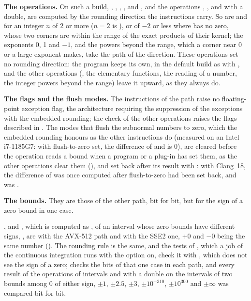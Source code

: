 \documentclass[12pt,a4paper,twoside,openright]{book}
\begin{document}
\medskip
\noindent
\textbf{The operations.} On such a build, , ,
, ,  and , and the
operations \code{+}, \code{-}, \code{*} and \code{/} with a double, are
computed by the rounding direction the instructions carry. So are
 and  for an integer $n$ of 2 or more
($n=2$ is ), or of $-2$ or less where  has no zero,
whose two corners are within the range of the exact products of their kernel;
the exponents 0, 1 and $-1$, and the powers beyond the range, which a corner
near 0 or a large exponent makes, take the path of the direction. These
operations set no rounding direction: the program keeps its own, in the
default build as with , and the other
operations (\code{\%}, the elementary functions, the reading of a number, the
integer powers beyond the range) leave it upward, as they always do.

\medskip
\noindent
\textbf{The flags and the flush modes.} The instructions of the path raise no
floating-point exception flag, the architecture requiring the suppression of
the exceptions with the embedded rounding; the check of the other operations
raises the flags described in . The modes that flush
the subnormal numbers to zero, which the embedded rounding honours as the
other instructions do (measured on an Intel i7-1185G7: with flush-to-zero
set, the difference of  and  is 0), are cleared
before the operation reads a bound when a program or a plug-in has set them,
as the other operations clear them (), and set back after its
result with : with Clang~18, the difference
of  was once computed after flush-to-zero had been set back, and
\code{[3e-308] - [2.9e-308]} was .\newinvfive

\medskip
\noindent
\textbf{The bounds.} They are those of the other path, bit for bit, but for
the sign of a zero bound in one case.

\begin{Rem}\label{rem:avx512-zero}
,  and , which is computed as
,\newinvfive{} of an interval whose zero bounds have different
signs, , are  with the AVX-512 path and 
with the SSE2 one, $+0$ and $-0$ being the same number
(). The rounding rule is the same, and the tests of
, which a job of the continuous integration runs with the option
on, check it with \code{==}, which does not see the sign of a zero;
 checks the bits of that one case in each path, and
every result of the operations of intervals and with a double on the
intervals of two bounds among 0 of either sign, $\pm1$, $\pm2.5$, $\pm3$,
$\pm10^{-310}$, $\pm10^{300}$ and $\pm\infty$ was compared bit for bit.
\end{Rem}
\end{document}
